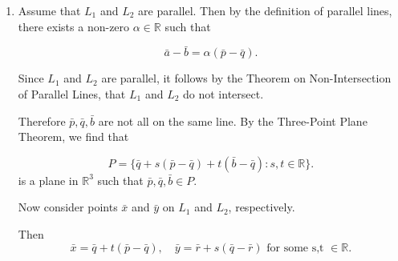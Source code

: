 \begin{proofbox}

  \begin{enumerate}[label=(\arabic*), series = ParLinProof]
    \item Assume that \(L_1\) and \(L_2\) are parallel. Then by the definition of parallel lines, there exists a non-zero \(\alpha \in \mathbb{R}\) such that

    \[
      \bar{a} - \bar{b} = \alpha(\bar{p} - \bar{q}).
    \]

    Since \(L_1\) and \(L_2\) are parallel, it follows by the Theorem on Non-Intersection of Parallel Lines, that \(L_1\) and \(L_2\) do not intersect.

    Therefore \(\bar{p},\bar{q}, \bar{b}\) are not all on the same line. By the Three-Point Plane Theorem, we find that

    \[
      P = \{\bar{q} + s(\bar{p} - \bar{q}) + t(\bar{b} - \bar{q}) : s, t \in \mathbb{R}\}.
    \]
    is a plane in \(\mathbb{R}^3\) such that \(\bar{p}, \bar{q}, \bar{b} \in P\).

    Now consider points \(\bar{x}\) and \(\bar{y}\) on \(L_1\) and \(L_2\), respectively.

    Then
    \[
      \bar{x} = \bar{q} + t(\bar{p} - \bar{q}), \quad
      \bar{y} = \bar{r} + s(\bar{q} - \bar{r}) \text{ for some s,t } \in \mathbb{R}.
    \]

  
    



  \end{enumerate}
\end{proofbox}